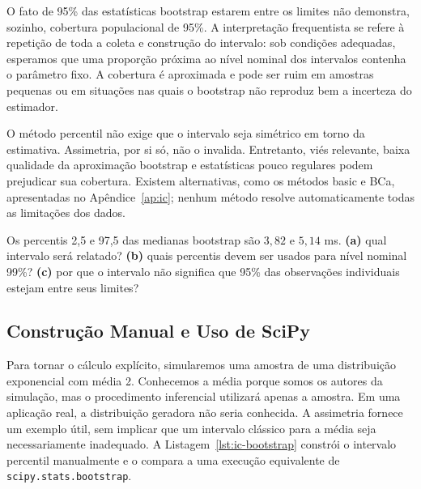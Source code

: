 \documentclass[12pt,a4paper]{article}
\begin{document}
O fato de 95\% das estatísticas bootstrap estarem entre os limites não demonstra, sozinho, cobertura populacional de 95\%. A interpretação frequentista se refere à repetição de toda a coleta e construção do intervalo: sob condições adequadas, esperamos que uma proporção próxima ao nível nominal dos intervalos contenha o parâmetro fixo. A cobertura é aproximada e pode ser ruim em amostras pequenas ou em situações nas quais o bootstrap não reproduz bem a incerteza do estimador.

O método percentil não exige que o intervalo seja simétrico em torno da estimativa. Assimetria, por si só, não o invalida. Entretanto, viés relevante, baixa qualidade da aproximação bootstrap e estatísticas pouco regulares podem prejudicar sua cobertura. Existem alternativas, como os métodos basic e BCa, apresentadas no Apêndice~\ref{ap:ic}; nenhum método resolve automaticamente todas as limitações dos dados.

\begin{perguntabox}
Os percentis 2,5 e 97,5 das medianas bootstrap são $3{,}82$ e $5{,}14$ ms. \textbf{(a)} qual intervalo será relatado? \textbf{(b)} quais percentis devem ser usados para nível nominal 99\%? \textbf{(c)} por que o intervalo não significa que 95\% das observações individuais estejam entre seus limites?
\end{perguntabox}

\subsection{Construção Manual e Uso de SciPy}
Para tornar o cálculo explícito, simularemos uma amostra de uma distribuição exponencial com média 2. Conhecemos a média porque somos os autores da simulação, mas o procedimento inferencial utilizará apenas a amostra. Em uma aplicação real, a distribuição geradora não seria conhecida. A assimetria fornece um exemplo útil, sem implicar que um intervalo clássico para a média seja necessariamente inadequado. A Listagem~\ref{lst:ic-bootstrap} constrói o intervalo percentil manualmente e o compara a uma execução equivalente de \texttt{scipy.stats.bootstrap}.
\end{document}
